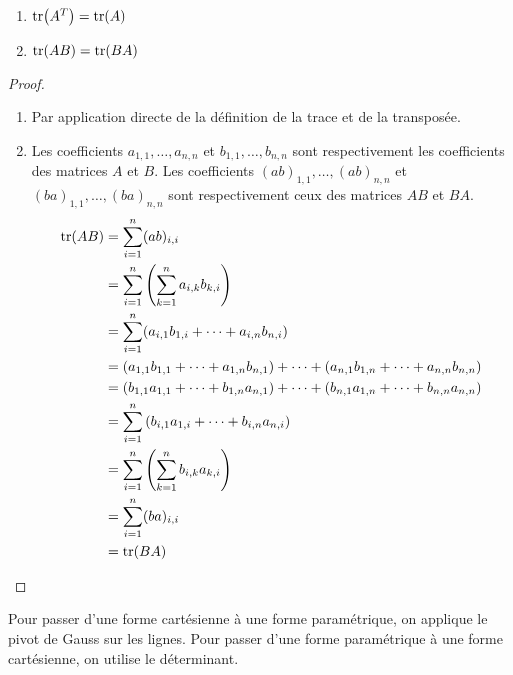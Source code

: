 \begin{lemma}
	\begin{multicols}{2}
	    \begin{enumerate}
    		\item $\tr(A^T) = \tr(A)$
    		\item $\tr(A B) = \tr(B A)$
    	\end{enumerate}
	\end{multicols}
\end{lemma}

\begin{proof}
	\leavevmode
    \begin{enumerate}
        \item Par application directe de la définition de la trace et de la transposée.
        \item Les coefficients $a_{1,1}, \ldots, a_{n,n}$ et $b_{1,1}, \ldots, b_{n,n}$ sont respectivement les coefficients des matrices $A$ et $B$. Les coefficients $(ab)_{1,1}, \ldots, (ab)_{n,n}$ et $(ba)_{1,1}, \ldots, (ba)_{n,n}$ sont respectivement ceux des matrices $AB$ et $BA$.
        \begin{align*}
        	\tr(AB) &= \sum_{i=1}^n (ab)_{i,i} \\
        			&= \sum_{i=1}^n \left( \sum_{k=1}^n a_{i,k} b_{k,i} \right) \\
        			&= \sum_{i=1}^n (a_{i,1} b_{1,i} + \cdots + a_{i,n} b_{n,i}) \\
        			&= (a_{1,1} b_{1,1} + \cdots + a_{1,n} b_{n,1}) + \cdots + (a_{n,1} b_{1,n} + \cdots + a_{n,n} b_{n,n}) \\
        			&= (b_{1,1}a_{1,1} + \cdots + b_{1,n}a_{n,1}) + \cdots + (b_{n,1} a_{1,n} + \cdots + b_{n,n} a_{n,n}) \\
        			&= \sum_{i=1}^n \left( b_{i,1} a_{1,i} + \cdots + b_{i,n} a_{n,i} \right) \\
        			&= \sum_{i=1}^n \left( \sum_{k=1}^n b_{i,k} a_{k,i} \right) \\
        			&= \sum_{i=1}^n (ba)_{i,i} \\
        			&= \tr(BA)
        \end{align*}
    \end{enumerate}
\end{proof}

\begin{proposition}
    Pour passer d'une forme cartésienne à une forme paramétrique, on applique le pivot de Gauss sur les lignes.
    Pour passer d'une forme paramétrique à une forme cartésienne, on utilise le déterminant.
\end{proposition}

